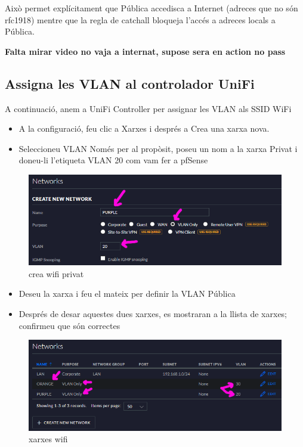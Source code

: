 \documentclass[
  10pt,
]{krantz}
\providecommand{\tightlist}{%
  \setlength{\itemsep}{0pt}\setlength{\parskip}{0pt}}
\begin{document}
Això permet explícitament que Pública accedisca a Internet (adreces que no són rfc1918) mentre que la regla de catchall bloqueja l'accés a adreces locals a Pública.

\textbf{Falta mirar video no vaja a internat, supose sera en action no pass}

\hypertarget{assigna-les-vlan-al-controlador-unifi}{%
\subsection{Assigna les VLAN al controlador UniFi}\label{assigna-les-vlan-al-controlador-unifi}}

A continuació, anem a UniFi Controller per assignar les VLAN als SSID WiFi

\begin{itemize}
\tightlist
\item
  A la configuració, feu clic a Xarxes i després a Crea una xarxa nova.
\item
  Seleccioneu VLAN Només per al propòsit, poseu un nom a la xarxa Privat i doneu-li l'etiqueta VLAN 20 com vam fer a pfSense
\end{itemize}

\begin{figure}
\centering
\includegraphics{imatges/wifi/unifi_01_purple_vlan.png}
\caption{crea wifi privat}
\end{figure}

\begin{itemize}
\tightlist
\item
  Deseu la xarxa i feu el mateix per definir la VLAN Pública
\item
  Després de desar aquestes dues xarxes, es mostraran a la llista de xarxes; confirmeu que són correctes
\end{itemize}

\begin{figure}
\centering
\includegraphics{imatges/wifi/unifi_03_vlans.png}
\caption{xarxes wifi}
\end{figure}
\end{document}
